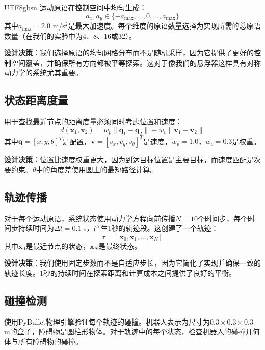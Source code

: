 \documentclass[11pt]{article}
\begin{document}
\begin{CJK}{UTF8}{gbsn}
运动原语在控制空间中均匀生成：
\begin{equation}
a_x, a_y \in \{-a_{\max}, \ldots, 0, \ldots, a_{\max}\}
\end{equation}
其中$a_{\max} = 2.0$ m/s$^2$是最大加速度。每个维度的原语数量选择为实现所需的总原语数量（在我们的实验中为4、8、16或32）。

\textbf{设计决策}：我们选择原语的均匀网格分布而不是随机采样，因为它提供了更好的控制空间覆盖，并确保所有方向都被平等探索。这对于像我们的悬浮器这样具有对称动力学的系统尤其重要。

\subsection{状态距离度量}

用于查找最近节点的距离度量必须同时考虑位置和速度：
\begin{equation}
d(\mathbf{x}_1, \mathbf{x}_2) = w_p \|\mathbf{q}_1 - \mathbf{q}_2\| + w_v \|\mathbf{v}_1 - \mathbf{v}_2\|
\end{equation}
其中$\mathbf{q} = [x, y, \theta]^T$是配置，$\mathbf{v} = [v_x, v_y, v_\theta]^T$是速度，$w_p = 1.0$，$w_v = 0.3$是权重。

\textbf{设计决策}：位置比速度权重更大，因为到达目标位置是主要目标，而速度匹配是次要约束。$\theta$中的角度差使用圆上的最短路径计算。

\subsection{轨迹传播}

对于每个运动原语，系统状态使用动力学方程向前传播$N = 10$个时间步，每个时间步持续时间为$\Delta t = 0.1$ s，产生1秒的轨迹段。这创建了一个轨迹：
\begin{equation}
\tau = [\mathbf{x}_0, \mathbf{x}_1, \ldots, \mathbf{x}_N]
\end{equation}
其中$\mathbf{x}_0$是最近节点的状态，$\mathbf{x}_N$是最终状态。

\textbf{设计决策}：我们使用固定步数而不是自适应步长，因为它简化了实现并确保一致的轨迹长度。1秒的持续时间在探索距离和计算成本之间提供了良好的平衡。

\subsection{碰撞检测}

使用PyBullet物理引擎验证每个轨迹的碰撞。机器人表示为尺寸为$0.3 \times 0.3 \times 0.3$ m的盒子，障碍物是圆柱形物体。对于轨迹中的每个状态，检查机器人的碰撞几何体与所有障碍物的碰撞。


\end{CJK}
\end{document}
